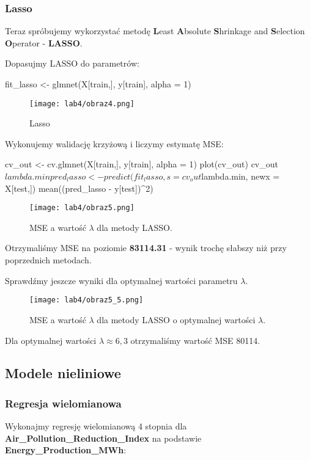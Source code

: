 \subsubsection{Lasso}
Teraz spróbujemy wykorzystać metodę \textbf{L}east \textbf{A}bsolute \textbf{S}hrinkage and \textbf{S}election \textbf{O}perator - \textbf{LASSO}.

Dopasujmy LASSO do parametrów:

\begin{Rcode}
fit_lasso <- glmnet(X[train,], y[train], alpha = 1)
\end{Rcode}

\begin{figure}[H]
    \centering
    \texttt{[image: lab4/obraz4.png]}
    \caption{Lasso}
    \label{fig:enter-label}
\end{figure}

Wykonujemy walidację krzyżową i liczymy estymatę MSE:

\begin{Rcode}
cv_out <- cv.glmnet(X[train,], y[train], alpha = 1)
plot(cv_out)
cv_out$lambda.min
pred_lasso <- predict(fit_lasso, s = cv_out$lambda.min, newx = X[test,])
mean((pred_lasso - y[test])^2)
\end{Rcode}

\begin{figure}[H]
    \centering
    \texttt{[image: lab4/obraz5.png]}
    \caption{MSE a wartość $\lambda$ dla metody LASSO.}
    \label{fig:enter-label}
\end{figure}

Otrzymaliśmy MSE na poziomie \textbf{83114.31} - wynik trochę słabszy niż przy poprzednich metodach.

Sprawdźmy jeszcze wyniki dla optymalnej wartości parametru $\lambda$.

\begin{figure}[H]
    \centering
    \texttt{[image: lab4/obraz5\_5.png]}
    \caption{MSE a wartość $\lambda$ dla metody LASSO o optymalnej wartości $\lambda$.}
    \label{fig:enter-label}
\end{figure}

Dla optymalnej wartości $\lambda \approx 6{,}3$ otrzymaliśmy wartość MSE 80114.

\subsection{Modele nieliniowe}

\subsubsection{Regresja wielomianowa}
Wykonajmy regresję wielomianową 4 stopnia dla \textbf{Air\_Pollution\_Reduction\_Index} na podstawie \textbf{Energy\_Production\_MWh}:

